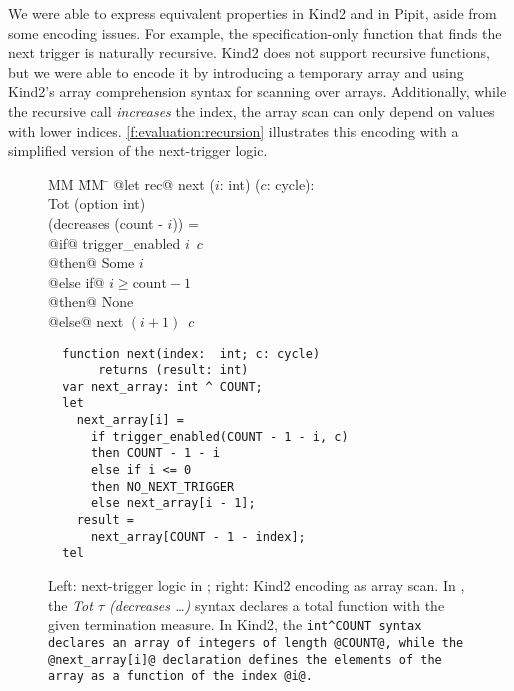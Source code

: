 We were able to express equivalent properties in Kind2 and in Pipit, aside from some encoding issues.
For example, the specification-only function that finds the next trigger is naturally recursive.
Kind2 does not support recursive functions, but we were able to encode it by introducing a temporary array and using Kind2's array comprehension syntax for scanning over arrays.
Additionally, while the recursive call \emph{increases} the index, the array scan can only depend on values with lower indices.
\autoref{f:evaluation:recursion} illustrates this encoding with a simplified version of the next-trigger logic.

\begin{figure}
\begin{minipage}{0.45\textwidth}
\begin{tabbing}
  MM \= MM \= \kill
@let rec@ next ($i$: int) ($c$: cycle): \\
  \> Tot \> (option int) \\
  \>     \> (decreases (count - $i$)) = \\
\>  @if@ trigger_enabled $i$~$c$ \\
\>  @then@ Some $i$ \\
\>  @else if@ $i \ge \text{count} - 1$ \\
\>  @then@ None \\
\>  @else@ next $(i + 1)$~$c$
\end{tabbing}
\end{minipage}
\begin{minipage}{0.55\textwidth}
\begin{verbatim}
  function next(index:  int; c: cycle)
       returns (result: int)
  var next_array: int ^ COUNT;
  let
    next_array[i] =
      if trigger_enabled(COUNT - 1 - i, c)
      then COUNT - 1 - i
      else if i <= 0
      then NO_NEXT_TRIGGER
      else next_array[i - 1];
    result =
      next_array[COUNT - 1 - index];
  tel
\end{verbatim}
\end{minipage}
\caption{Left: next-trigger logic in \fstar{}; right: Kind2 encoding as array scan. In \fstar{}, the \emph{Tot $\tau$ (decreases \ldots)} syntax declares a total function with the given termination measure.
In Kind2, the \tt{int\^{}COUNT} syntax declares an array of integers of length @COUNT@, while the @next_array[i]@ declaration defines the elements of the array as a function of the index @i@.
}
\label{f:evaluation:recursion}
\end{figure}

